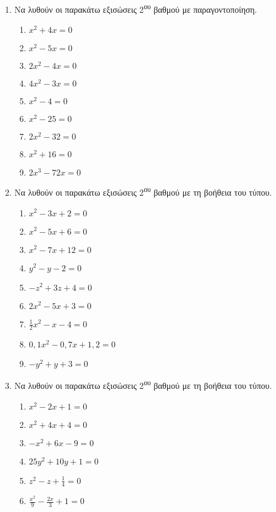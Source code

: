 \documentclass[twoside,nofonts,internet]{askhseis}
\begin{document}
\begin{enumerate}
\item Να λυθούν οι παρακάτω εξισώσεις 2\textsuperscript{ου} βαθμού με παραγοντοποίηση.
\begin{multicols}{3}
\begin{enumerate}[label=\roman*.]
\item $ x^2+4x=0 $
\item $ x^2-5x=0 $
\item $ 2x^2-4x=0 $
\item $ 4x^2-3x=0 $
\item $ x^2-4=0 $
\item $ x^2-25=0 $
\item $ 2x^2-32=0 $
\item $ x^2+16=0 $
\item $ 2x^3-72x=0 $
\end{enumerate}
\end{multicols}
\item Να λυθούν οι παρακάτω εξισώσεις 2\textsuperscript{ου} βαθμού με τη βοήθεια του τύπου.
\begin{multicols}{3}
\begin{enumerate}[label=\roman*.]
\item $ x^2-3x+2=0 $
\item $ x^2-5x+6=0 $
\item $ x^2-7x+12=0 $
\item $ y^2-y-2=0 $
\item $ -z^2+3z+4=0 $
\item $ 2x^2-5x+3=0 $
\item $ \frac{1}{2}x^2-x-4=0 $
\item $ 0{,}1x^2-0{,}7x+1{,}2=0 $
\item $ -y^2+y+3=0 $
\end{enumerate}
\end{multicols}
\item Να λυθούν οι παρακάτω εξισώσεις 2\textsuperscript{ου} βαθμού με τη βοήθεια του τύπου.
\begin{multicols}{3}
\begin{enumerate}[label=\roman*.]
\item $ x^2-2x+1=0 $
\item $ x^2+4x+4=0 $
\item $ -x^2+6x-9=0 $
\item $ 25y^2+10y+1=0 $
\item $ z^2-z+\frac{1}{4}=0 $
\item $ \frac{x^2}{9}-\frac{2x}{3}+1=0 $
\end{enumerate}

\end{multicols}
\end{enumerate}
\end{document}
